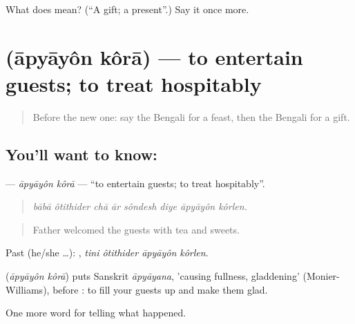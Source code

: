 \begin{tcolorbox}[breakable,colback=teal!4,colframe=teal!35!black,title={Before you move on}]
What does  mean? (\textquotedblleft{}A gift; a present\textquotedblright{}.) Say it once more.
\end{tcolorbox}
\section[\texorpdfstring{\bn{আপ্যায়ন} \bn{করা} (āpyāyôn kôrā)}{আপ্যায়ন করা (āpyāyôn kôrā)}]{  (āpyāyôn kôrā) — to entertain guests; to treat hospitably}

\label{lesson:BN-C306-apyayon-kora}



\begin{quote}
Before the new one: say the Bengali for a feast, then the Bengali for a gift.
\end{quote}

\subsection*{You'll want to know:  }
\textbf{ } — \emph{āpyāyôn kôrā} — \textquotedblleft{}to entertain guests; to treat hospitably\textquotedblright{}.

\begin{quote}
       
\end{quote}

\begin{quote}
\emph{bābā ôtithider chā ār sôndesh diye āpyāyôn kôrlen.}
\end{quote}

\begin{quote}
Father welcomed the guests with tea and sweets.
\end{quote}

Past (he/she …):    , \emph{tini ôtithider āpyāyôn kôrlen}.

\begin{cousinweb}
\textbf{ } (\emph{āpyāyôn kôrā}) puts Sanskrit \emph{āpyāyana}, 'causing fullness, gladdening' (Monier-Williams), before : to fill your guests up and make them glad.
\end{cousinweb}

\begin{grammarlens}[title={What you've built}]
One more word for telling what happened.
\end{grammarlens}

